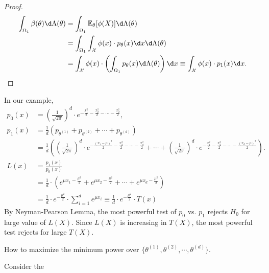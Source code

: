 \documentclass[a4paper]{article}
\begin{document}
\begin{eg}
\begin{answer}
		\begin{proof}
			\begin{equation}
				\begin{aligned}
					\int_{\Omega_1} \beta(\theta) \d \Lambda(\theta) &= \int_{\Omega_1} \mathbb{E}_{\theta}[\phi(X)] \d \Lambda(\theta) \\
					&= \int_{\Omega_1} \int_{\mathcal{X}} \phi(x) \cdot p_\theta(x) \d x \d \Lambda(\theta) \\
					&= \int_{\mathcal{X}} \phi(x) \cdot \left(\int_{\Omega_1} p_\theta(x) \d \Lambda(\theta)\right) \d x \equiv \int_{\mathcal{X}} \phi(x) \cdot p_1(x) \d x.
				\end{aligned}
			\end{equation}
		\end{proof}
		\noindent In our example,
		\begin{equation}
			\begin{aligned}
				p_0(x) &= \left(\frac{1}{\sqrt{2\pi}}\right)^d \cdot  e^{-\frac{x_1^2}{2}-\frac{x_2^2}{2}-\cdots-\frac{x_d^2}{2}}, \\
				p_1(x) &= \frac{1}{d}(p_{\theta^{(1)}}+p_{\theta^{(2)}}+\cdots+p_{\theta^{(d)}}) \\
				&= \frac{1}{d}\left(\left(\frac{1}{\sqrt{2\pi}}\right)^d \cdot e^{-\frac{(x_1-\mu)^2}{2}-\frac{x_2^2}{2}-\cdots-\frac{x_d^2}{2}} + \cdots + \left(\frac{1}{\sqrt{2\pi}}\right)^d \cdot e^{-\frac{x_1^2}{2}-\frac{x_2^2}{2}-\cdots-\frac{(x_d - \mu)^2}{2}}\right). \\
				L(x) &= \frac{p_1(x)}{p_0(x)} \\
				&= \frac{1}{d} \cdot (e^{\mu x_1 - \frac{\mu^2}{2}}+e^{\mu x_2 - \frac{\mu^2}{2}}+ \cdots + e^{\mu x_d - \frac{\mu^2}{2}}) \\
				&= \frac{1}{d} \cdot e^{-\frac{\mu^2}{2}} \cdot \sum\limits_{i=1}^d e^{\mu x_i} \equiv \frac{1}{d} \cdot e^{-\frac{\mu^2}{2}} \cdot T(x)
			\end{aligned}
		\end{equation}
		By Neyman-Pearson Lemma, the most powerful test of $p_0$ vs. $p_1$ rejects $H_0$ for large value of $L(X)$. Since $L(X)$ is increasing in $T(X)$, the most powerful test rejects for large $T(X)$.
	\end{answer}
	\begin{question}
		How to maximize the minimum power over $\{\theta^{(1)}, \theta^{(2)}, \cdots, \theta^{(d)}\}$.
	\end{question}
	\begin{answer} Consider the 
		\begin{prop}

\end{prop}
\end{answer}
\end{eg}
\end{document}
